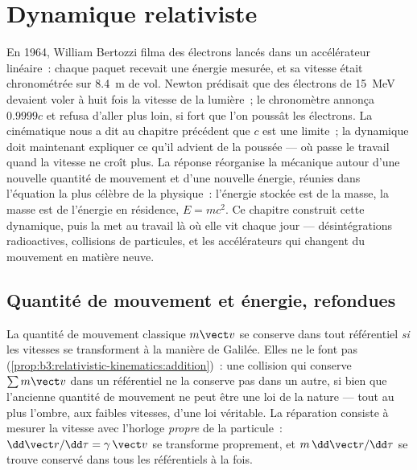 \chapter{Dynamique relativiste}\label{ch:b3:relativistic-dynamics}

En 1964, William Bertozzi filma des électrons lancés dans un
accélérateur linéaire~: chaque paquet recevait une énergie mesurée, et
sa vitesse était chronométrée sur \qty{8.4}{m} de vol. Newton prédisait
que des électrons de \qty{15}{MeV} devaient voler à huit fois la
vitesse de la lumière~; le chronomètre annonça $0.9999c$ et refusa
d'aller plus loin, si fort que l'on poussât les électrons. La
cinématique nous a dit au chapitre précédent que $c$ est une limite~;
la dynamique doit maintenant expliquer ce qu'il advient de la poussée
--- où passe le travail quand la vitesse ne croît plus. La réponse
réorganise la mécanique autour d'une nouvelle quantité de mouvement et
d'une nouvelle énergie, réunies dans l'équation la plus célèbre de la
physique~: l'énergie stockée est de la masse, la masse est de l'énergie
en résidence, $E = mc^2$. Ce chapitre construit cette dynamique, puis
la met au travail là où elle vit chaque jour --- désintégrations
radioactives, collisions de particules, et les accélérateurs qui
changent du mouvement en matière neuve.

\section{Quantité de mouvement et énergie, refondues}

\begin{remark}\label{rem:b3:relativistic-dynamics:why}
La quantité de mouvement classique $m\vect v$ se conserve dans tout
référentiel \emph{si} les vitesses se transforment à la manière de
Galilée. Elles ne le font pas
(\cref{prop:b3:relativistic-kinematics:addition})~: une collision qui
conserve $\sum m\vect v$ dans un référentiel ne la conserve pas dans un
autre, si bien que l'ancienne quantité de mouvement ne peut être une
loi de la nature --- tout au plus l'ombre, aux faibles vitesses, d'une
loi véritable. La réparation consiste à mesurer la vitesse avec
l'horloge \emph{propre} de la particule~: $\dd\vect r/\dd\tau =
\gamma\,\vect v$ se transforme proprement, et $m\,\dd\vect r/\dd\tau$
se trouve conservé dans tous les référentiels à la fois.
\end{remark}

